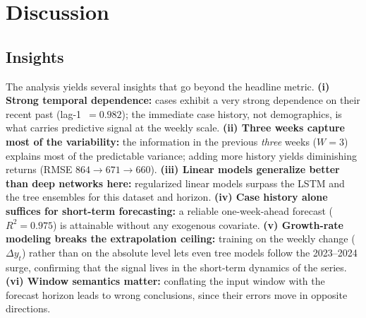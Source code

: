 \documentclass[runningheads]{llncs}
\begin{document}
\section{Discussion}
\subsection{Insights}
The analysis yields several insights that go beyond the headline metric.
\textbf{(i) Strong temporal dependence:} cases exhibit a very strong dependence on their
recent past (lag-1~$=0.982$); the immediate case history, not demographics, is what carries
predictive signal at the weekly scale.
\textbf{(ii) Three weeks capture most of the variability:} the information in the previous
\emph{three} weeks ($W=3$) explains most of the predictable variance; adding more history
yields diminishing returns (RMSE $864\to671\to660$).
\textbf{(iii) Linear models generalize better than deep networks here:} regularized linear
models surpass the LSTM and the tree ensembles for this dataset and horizon.
\textbf{(iv) Case history alone suffices for short-term forecasting:} a reliable one-week-ahead
forecast ($R^2=0.975$) is attainable without any exogenous covariate.
\textbf{(v) Growth-rate modeling breaks the extrapolation ceiling:} training on the weekly
change ($\Delta y_t$) rather than on the absolute level lets even tree models follow the
2023--2024 surge, confirming that the signal lives in the short-term dynamics of the series.
\textbf{(vi) Window semantics matter:} conflating the input window with the forecast horizon
leads to wrong conclusions, since their errors move in opposite directions.
\end{document}
